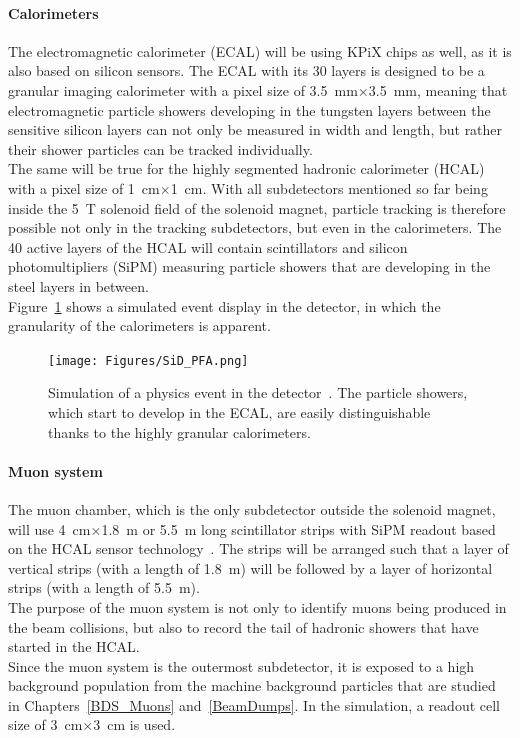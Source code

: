 \paragraph{Calorimeters}
The electromagnetic calorimeter (ECAL) will be using KPiX chips as well, as it is also based on silicon sensors.
The ECAL with its 30 layers is designed to be a granular imaging calorimeter with a pixel size of \SI{3.5}{\milli\meter}$\times$\SI{3.5}{\milli\meter}, meaning that electromagnetic particle showers developing in the tungsten layers between the sensitive silicon layers can not only be measured in width and length, but rather their shower particles can be tracked individually.
\\The same will be true for the highly segmented hadronic calorimeter (HCAL) with a pixel size of \SI{1}{\centi\meter}$\times$\SI{1}{\centi\meter}.
With all subdetectors mentioned so far being inside the \SI{5}{\tesla} solenoid field of the \sid solenoid magnet, particle tracking is therefore possible not only in the tracking subdetectors, but even in the calorimeters.
The 40 active layers of the HCAL will contain scintillators and silicon photomultipliers (SiPM) measuring particle showers that are developing in the steel layers in between.
\\Figure~\ref{fig:SiD_PFA} shows a simulated event display in the \sid detector, in which the granularity of the calorimeters is apparent.
\begin{figure}[h!]
\centering
\texttt{[image: Figures/SiD\_PFA.png]}
\caption[Visualization of the granular \sid calorimeters]{Simulation of a physics event in the \sid detector~\cite{SiD_Update2}.
The particle showers, which start to develop in the ECAL, are easily distinguishable thanks to the highly granular calorimeters.}
\label{fig:SiD_PFA}
\end{figure}

\paragraph{Muon system}
The muon chamber, which is the only subdetector outside the solenoid magnet, will use \SI{4}{\centi\meter}$\times$\SI{1.8}{\meter} or \SI{5.5}{\meter} long scintillator strips with SiPM readout based on the HCAL sensor technology~\cite[p. 113]{TDR4}.
The strips will be arranged such that a layer of vertical strips (with a length of \SI{1.8}{\meter}) will be followed by a layer of horizontal strips (with a length of \SI{5.5}{\meter}).
\\The purpose of the muon system is not only to identify muons being produced in the beam collisions, but also to record the tail of hadronic showers that have started in the HCAL.
\\Since the muon system is the outermost subdetector, it is exposed to a high background population from the machine background particles that are studied in Chapters~\ref{BDS_Muons} and~\ref{BeamDumps}.
In the simulation, a readout cell size of \SI{3}{\centi\meter}$\times$\SI{3}{\centi\meter} is used.

